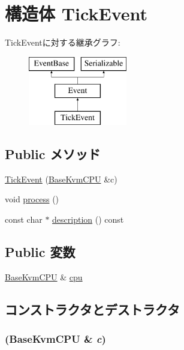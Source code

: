 \hypertarget{structBaseKvmCPU_1_1TickEvent}{
\section{構造体 TickEvent}
\label{structBaseKvmCPU_1_1TickEvent}
}
TickEventに対する継承グラフ:\begin{figure}[H]
\begin{center}
\leavevmode
\includegraphics[height=3cm]{structBaseKvmCPU_1_1TickEvent}
\end{center}
\end{figure}
\subsection*{Public メソッド}
\begin{DoxyCompactItemize}
\item 
\hyperlink{structBaseKvmCPU_1_1TickEvent_a0cf125d5e9c74145a4b007bdfd646236}{TickEvent} (\hyperlink{classBaseKvmCPU_1_1BaseKvmCPU}{BaseKvmCPU} \&c)
\item 
void \hyperlink{structBaseKvmCPU_1_1TickEvent_a2e9c5136d19b1a95fc427e0852deab5c}{process} ()
\item 
const char $\ast$ \hyperlink{structBaseKvmCPU_1_1TickEvent_a2bd90422eece9190794479e08092a252}{description} () const 
\end{DoxyCompactItemize}
\subsection*{Public 変数}
\begin{DoxyCompactItemize}
\item 
\hyperlink{classBaseKvmCPU_1_1BaseKvmCPU}{BaseKvmCPU} \& \hyperlink{structBaseKvmCPU_1_1TickEvent_ad3132ce2aaba599747054be6dd41e0b8}{cpu}
\end{DoxyCompactItemize}


\subsection{コンストラクタとデストラクタ}
\hypertarget{structBaseKvmCPU_1_1TickEvent_a0cf125d5e9c74145a4b007bdfd646236}{
\subsubsection[{TickEvent}]{ ({\bf BaseKvmCPU} \& {\em c})}}
\label{structBaseKvmCPU_1_1TickEvent_a0cf125d5e9c74145a4b007bdfd646236}



